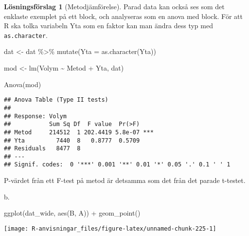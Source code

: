 \documentclass[
]{book}
\newenvironment{Shaded}{\begin{snugshade}}{\end{snugshade}}
\newcommand{\AttributeTok}[1]{\textcolor[rgb]{0.77,0.63,0.00}{#1}}
\newcommand{\FunctionTok}[1]{\textcolor[rgb]{0.00,0.00,0.00}{#1}}
\newcommand{\NormalTok}[1]{#1}
\newcommand{\OtherTok}[1]{\textcolor[rgb]{0.56,0.35,0.01}{#1}}
\newcommand{\SpecialCharTok}[1]{\textcolor[rgb]{0.00,0.00,0.00}{#1}}
\theoremstyle{definition}
\theoremstyle{definition}
\theoremstyle{definition}
\theoremstyle{definition}
\newtheorem{hypothesis}{Lösningsförslag}[chapter]
\theoremstyle{remark}
\begin{document}
\begin{hypothesis}[Metodjämförelse]
Parad data kan också ses som det enklaste exemplet på ett block, och analyseras som en anova med block. För att R ska tolka variabeln Yta som en faktor kan man ändra dess typ med \texttt{as.character}.

\begin{Shaded}
\begin{Highlighting}[]
\NormalTok{dat }\OtherTok{\textless{}{-}}\NormalTok{ dat }\SpecialCharTok{\%\textgreater{}\%} \FunctionTok{mutate}\NormalTok{(}\AttributeTok{Yta =} \FunctionTok{as.character}\NormalTok{(Yta))}

\NormalTok{mod }\OtherTok{\textless{}{-}} \FunctionTok{lm}\NormalTok{(Volym }\SpecialCharTok{\textasciitilde{}}\NormalTok{ Metod }\SpecialCharTok{+}\NormalTok{ Yta, dat)}

\FunctionTok{Anova}\NormalTok{(mod)}
\end{Highlighting}
\end{Shaded}

\begin{verbatim}
## Anova Table (Type II tests)
## 
## Response: Volym
##           Sum Sq Df  F value  Pr(>F)    
## Metod     214512  1 202.4419 5.8e-07 ***
## Yta         7440  8   0.8777  0.5709    
## Residuals   8477  8                     
## ---
## Signif. codes:  0 '***' 0.001 '**' 0.01 '*' 0.05 '.' 0.1 ' ' 1
\end{verbatim}

P-värdet från ett F-test på metod är detsamma som det från det parade t-testet.

b.

\begin{Shaded}
\begin{Highlighting}[]
\FunctionTok{ggplot}\NormalTok{(dat\_wide, }\FunctionTok{aes}\NormalTok{(B, A)) }\SpecialCharTok{+} 
  \FunctionTok{geom\_point}\NormalTok{()}
\end{Highlighting}
\end{Shaded}

\begin{center}\texttt{[image: R-anvisningar\_files/figure-latex/unnamed-chunk-225-1]} \end{center}

\begin{Shaded}
\end{Shaded}


\end{hypothesis}
\end{document}
